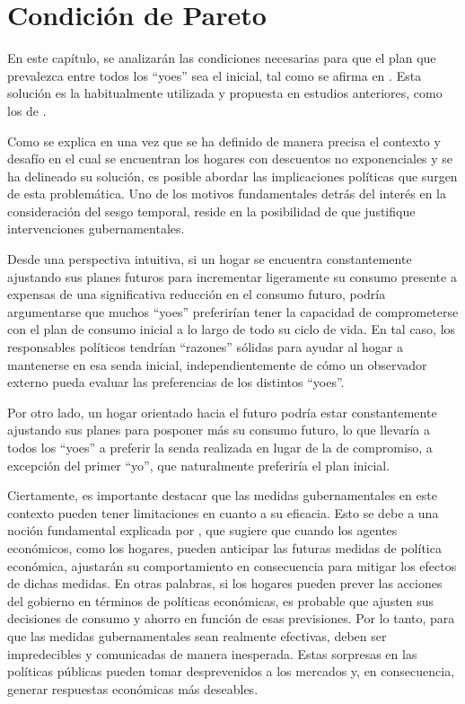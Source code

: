 \chapter{Condición de Pareto} 
\label{Pareto}
\label{cap_3}

En este capítulo, se analizarán las condiciones necesarias para que el plan que prevalezca entre todos los “yoes” sea el inicial, tal como se afirma en \parencite{feigenbaum2021deviation}. Esta solución es la habitualmente utilizada y propuesta en estudios anteriores, como los de \parencite{Laibson96,Laibson97,Laibson98,Laibson98b,ODonoghue99,ODonoghue00,ODonoghue01}.


Como se explica en \parencite{feigenbaum2021deviation} una vez que se ha definido de manera precisa el contexto y desafío en el cual se encuentran los hogares con descuentos no exponenciales y se ha delineado su solución, es posible abordar las implicaciones políticas que surgen de esta problemática. Uno de los motivos fundamentales detrás del interés en la consideración del sesgo temporal, reside en la posibilidad de que justifique intervenciones gubernamentales.

Desde una perspectiva intuitiva, si un hogar se encuentra constantemente ajustando sus planes futuros para incrementar ligeramente su consumo presente a expensas de una significativa reducción en el consumo futuro, podría argumentarse que muchos “yoes” preferirían tener la capacidad de comprometerse con el plan de consumo inicial a lo largo de todo su ciclo de vida. En tal caso, los responsables políticos tendrían “razones” sólidas para ayudar al hogar a mantenerse en esa senda inicial, independientemente de cómo un observador externo pueda evaluar las preferencias de los distintos “yoes”.

Por otro lado, un hogar orientado hacia el futuro podría estar constantemente ajustando sus planes para posponer más su consumo futuro, lo que llevaría a todos los “yoes” a preferir la senda realizada en lugar de la de compromiso, a excepción del primer “yo”, que naturalmente preferiría el plan inicial.

Ciertamente, es importante destacar que las medidas gubernamentales en este contexto pueden tener limitaciones en cuanto a su eficacia. Esto se debe a una noción fundamental explicada por \parencite{Lucas_1976}, que sugiere que cuando los agentes económicos, como los hogares, pueden anticipar las futuras medidas de política económica, ajustarán su comportamiento en consecuencia para mitigar los efectos de dichas medidas. En otras palabras, si los hogares pueden prever las acciones del gobierno en términos de políticas económicas, es probable que ajusten sus decisiones de consumo y ahorro en función de esas previsiones. Por lo tanto, para que las medidas gubernamentales sean realmente efectivas, deben ser impredecibles y comunicadas de manera inesperada. Estas sorpresas en las políticas públicas pueden tomar desprevenidos a los mercados y, en consecuencia, generar respuestas económicas más deseables.

